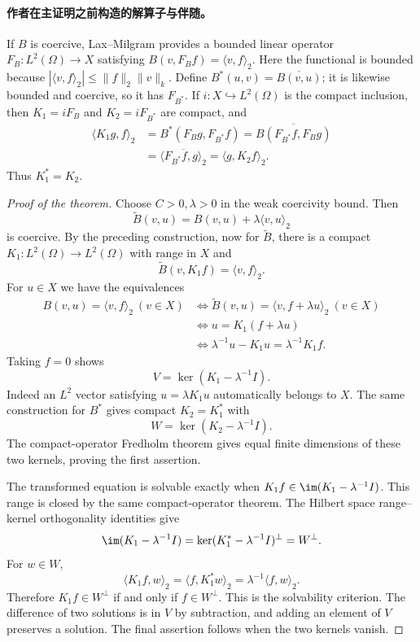 \paragraph{作者在主证明之前构造的解算子与伴随。}
If $B$ is coercive, Lax--Milgram provides a bounded linear operator
$F_B:L^2(\Omega)\to X$ satisfying
$B(v,F_Bf)=\langle v,f\rangle_2$. Here the functional is bounded because
$|\langle v,f\rangle_2|\leq\|f\|_2\|v\|_k$.
Define $B^*(u,v)=\overline{B(v,u)}$; it is likewise bounded and coercive,
so it has $F_{B^*}$. If $i:X\hookrightarrow L^2(\Omega)$ is the compact
inclusion, then $K_1=iF_B$ and $K_2=iF_{B^*}$ are compact, and
\begin{align*}
\langle K_1g,f\rangle_2
&=B^*(F_Bg,F_{B^*}f)
=\overline{B(F_{B^*}f,F_Bg)}\\
&=\overline{\langle F_{B^*}f,g\rangle_2}
=\langle g,K_2f\rangle_2.
\end{align*}
Thus $K_1^*=K_2$.
\begin{proof}[Proof of the theorem]
Choose $C>0,\lambda>0$ in the weak coercivity bound. Then
\[
\widetilde B(v,u)=B(v,u)+\lambda\langle v,u\rangle_2
\]
is coercive. By the preceding construction, now for $\widetilde B$,
there is a compact $K_1:L^2(\Omega)\to L^2(\Omega)$ with range in $X$
and
\[
\widetilde B(v,K_1f)=\langle v,f\rangle_2.
\]
For $u\in X$ we have the equivalences
\begin{align*}
 B(v,u)=\langle v,f\rangle_2\ (v\in X)
&\Longleftrightarrow\widetilde B(v,u)=\langle v,f+\lambda u\rangle_2\ (v\in X)\\
&\Longleftrightarrow u=K_1(f+\lambda u)\\
&\Longleftrightarrow \lambda^{-1}u-K_1u=\lambda^{-1}K_1f.
\end{align*}
Taking $f=0$ shows
\[
V=\ker(K_1-\lambda^{-1}I).
\]
Indeed an $L^2$ vector satisfying $u=\lambda K_1u$ automatically belongs
to $X$. The same construction for $B^*$ gives compact $K_2=K_1^*$ with
\[
W=\ker(K_2-\lambda^{-1}I).
\]
The compact-operator Fredholm theorem gives equal finite dimensions
of these two kernels, proving the first assertion.

The transformed equation is solvable exactly when
$K_1f\in\im(K_1-\lambda^{-1}I)$.
This range is closed by the same compact-operator theorem. The Hilbert
space range--kernel orthogonality identities give
\[
\im(K_1-\lambda^{-1}I)
=\ker(K_1^*-\lambda^{-1}I)^\perp=W^\perp.
\]
For $w\in W$,
\[
\langle K_1f,w\rangle_2
=\langle f,K_1^*w\rangle_2
=\lambda^{-1}\langle f,w\rangle_2.
\]
Therefore $K_1f\in W^\perp$ if and only if $f\in W^\perp$.
This is the solvability criterion. The difference of two solutions is
in $V$ by subtraction, and adding an element of $V$ preserves a solution.
The final assertion follows when the two kernels vanish.
\end{proof}
